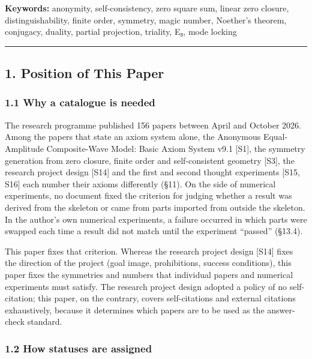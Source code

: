 \documentclass[
  a4paper,
]{article}
\begin{document}
\textbf{Keywords:} anonymity, self-consistency, zero square sum, linear
zero closure, distinguishability, finite order, symmetry, magic number,
Noether's theorem, conjugacy, duality, partial projection, triality, E₈,
mode locking

\begin{center}\rule{0.5\linewidth}{0.5pt}\end{center}

\subsection{1. Position of This Paper}\label{position-of-this-paper}

\subsubsection{1.1 Why a catalogue is
needed}\label{why-a-catalogue-is-needed}

The research programme published 156 papers between April and October
2026. Among the papers that state an axiom system alone, the Anonymous
Equal-Amplitude Composite-Wave Model: Basic Axiom System v9.1 {[}S1{]},
the symmetry generation from zero closure, finite order and
self-consistent geometry {[}S3{]}, the research project design {[}S14{]}
and the first and second thought experiments {[}S15, S16{]} each number
their axioms differently (§11). On the side of numerical experiments, no
document fixed the criterion for judging whether a result was derived
from the skeleton or came from parts imported from outside the skeleton.
In the author's own numerical experiments, a failure occurred in which
parts were swapped each time a result did not match until the experiment
``passed'' (§13.4).

This paper fixes that criterion. Whereas the research project design
{[}S14{]} fixes the direction of the project (goal image, prohibitions,
success conditions), this paper fixes the symmetries and numbers that
individual papers and numerical experiments must satisfy. The research
project design adopted a policy of no self-citation; this paper, on the
contrary, covers self-citations and external citations exhaustively,
because it determines which papers are to be used as the answer-check
standard.

\subsubsection{1.2 How statuses are
assigned}\label{how-statuses-are-assigned}
\end{document}
